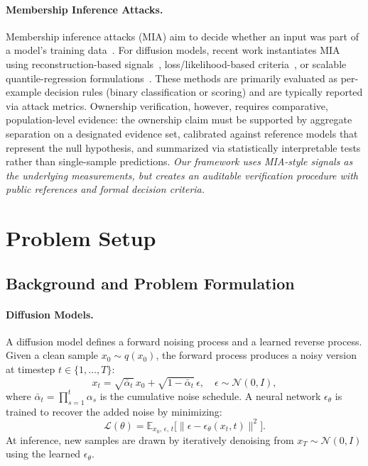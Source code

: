 \documentclass[sigconf, review, anonymous]{acmart}
\begin{document}
\paragraph{Membership Inference Attacks.}
Membership inference attacks (MIA) aim to decide whether an input was part of a model's training data~\citep{shokri2017membership,yeom2018privacy,salem2019ml}.
For diffusion models, recent work instantiates MIA using reconstruction-based signals~\citep{carlini2023extracting,duan2023diffusion,kong2024efficient}, loss/likelihood-based criteria~\citep{matsumoto2023membership,hu2023loss}, or scalable quantile-regression formulations~\citep{bertran2023scalable,tang2024membership}.
These methods are primarily evaluated as per-example decision rules (binary classification or scoring) and are typically reported via attack metrics.
Ownership verification, however, requires comparative, population-level evidence: the ownership claim must be supported by aggregate separation on a designated evidence set, calibrated against reference models that represent the null hypothesis, and summarized via statistically interpretable tests rather than single-sample predictions.
\textit{Our framework uses MIA-style signals as the underlying measurements, but creates an auditable verification procedure with public references and formal decision criteria.}
\section{Problem Setup}
\label{sec:problem}

\subsection{Background and Problem Formulation }

\paragraph{Diffusion Models.}
A diffusion model defines a forward noising process and a learned
reverse process. Given a clean sample $x_0 \sim q(x_0)$, the
forward process produces a noisy version at timestep $t \in
\{1, \dots, T\}$:
%
\begin{equation}
    x_t = \sqrt{\bar\alpha_t}\, x_0
        + \sqrt{1 - \bar\alpha_t}\,\epsilon,
    \quad \epsilon \sim \mathcal{N}(0, I),
\end{equation}
%
where $\bar\alpha_t = \prod_{s=1}^{t} \alpha_s$ is the cumulative
noise schedule. A neural network $\epsilon_\theta$ is trained to
recover the added noise by minimizing:
%
\begin{equation}
    \mathcal{L}(\theta)
    = \mathbb{E}_{x_0,\, \epsilon,\, t}
      \bigl[\lVert \epsilon
      - \epsilon_\theta(x_t, t) \rVert^2\bigr].
\end{equation}
%
At inference, new samples are drawn by iteratively denoising from
$x_T \sim \mathcal{N}(0, I)$ using the learned
$\epsilon_\theta$.
\end{document}
